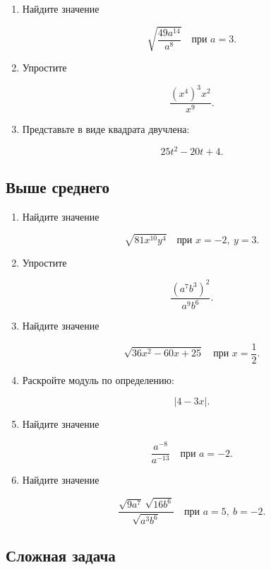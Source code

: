 \documentclass[a4paper,12pt]{article}
\begin{document}
\begin{enumerate}[label=\textbf{\arabic*.}]

\item
Найдите значение

\[
\sqrt{\frac{49a^{14}}{a^8}}
\quad
\text{при }a=3.
\]

\item
Упростите

\[
\frac{(x^4)^3x^2}{x^9}.
\]

\item
Представьте в виде квадрата двучлена:

\[
25t^2-20t+4.
\]

\end{enumerate}

\subsection*{Выше среднего}

\begin{enumerate}[label=\textbf{\arabic*.},resume]

\item
Найдите значение

\[
\sqrt{81x^{10}y^4}
\quad
\text{при }x=-2,\ y=3.
\]

\item
Упростите

\[
\frac{(a^7b^3)^2}{a^9b^6}.
\]

\item
Найдите значение

\[
\sqrt{36x^2-60x+25}
\quad
\text{при }x=\frac12.
\]

\item
Раскройте модуль по определению:

\[
|4-3x|.
\]

\item
Найдите значение

\[
\frac{a^{-8}}{a^{-13}}
\quad
\text{при }a=-2.
\]

\item
Найдите значение

\[
\frac{
\sqrt{9a^7}\,\sqrt{16b^6}
}{
\sqrt{a^3b^6}
}
\quad
\text{при }a=5,\ b=-2.
\]

\end{enumerate}

\subsection*{Сложная задача}
\end{document}
